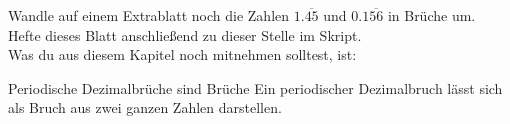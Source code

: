Wandle auf einem Extrablatt noch die Zahlen $1.\overline{45}$ und $0.1\overline{56}$ in Brüche um.
Hefte dieses Blatt anschließend zu dieser Stelle im Skript.\\
Was du aus diesem Kapitel noch mitnehmen solltest, ist:

\begin{law}{Periodische Dezimalbrüche sind Brüche}
	\label{law:periodicIsRational}
	Ein periodischer Dezimalbruch lässt sich als Bruch aus zwei ganzen Zahlen darstellen.
\end{law}~

